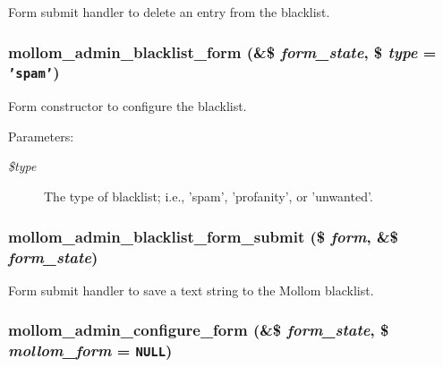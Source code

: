Form submit handler to delete an entry from the blacklist. \hypertarget{mollom_8admin_8inc_258ff9526e5c2282bf3caa9d4e5b1d45}{
\subsubsection[{mollom\_\-admin\_\-blacklist\_\-form}]{\setlength{\rightskip}{0pt plus 5cm}mollom\_\-admin\_\-blacklist\_\-form (\&\$ {\em form\_\-state}, \/  \$ {\em type} = {\tt 'spam'})}}
\label{mollom_8admin_8inc_258ff9526e5c2282bf3caa9d4e5b1d45}


Form constructor to configure the blacklist.

\begin{Desc}
\item[Parameters:]
\begin{description}
\item[{\em \$type}]The type of blacklist; i.e., 'spam', 'profanity', or 'unwanted'. \end{description}
\end{Desc}
\hypertarget{mollom_8admin_8inc_96e8372bde3200d7bf2cb52f6be26d80}{
\subsubsection[{mollom\_\-admin\_\-blacklist\_\-form\_\-submit}]{\setlength{\rightskip}{0pt plus 5cm}mollom\_\-admin\_\-blacklist\_\-form\_\-submit (\$ {\em form}, \/  \&\$ {\em form\_\-state})}}
\label{mollom_8admin_8inc_96e8372bde3200d7bf2cb52f6be26d80}


Form submit handler to save a text string to the Mollom blacklist. \hypertarget{mollom_8admin_8inc_ef4774c8636c4437de390854c58b5852}{
\subsubsection[{mollom\_\-admin\_\-configure\_\-form}]{\setlength{\rightskip}{0pt plus 5cm}mollom\_\-admin\_\-configure\_\-form (\&\$ {\em form\_\-state}, \/  \$ {\em mollom\_\-form} = {\tt NULL})}}
\label{mollom_8admin_8inc_ef4774c8636c4437de390854c58b5852}


